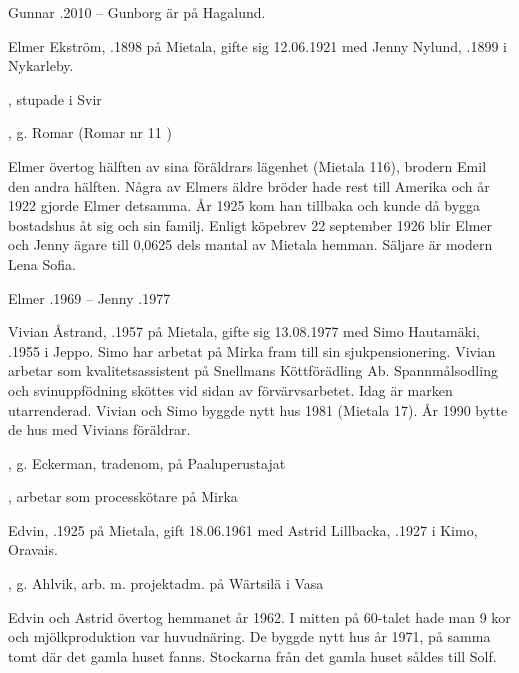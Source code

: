 Gunnar .2010  --  Gunborg är på Hagalund.


Elmer Ekström, .1898 på Mietala, gifte sig 12.06.1921 med Jenny Nylund, .1899 i Nykarleby.
\begin{jhchildren}
  \item {}, stupade i Svir
  \item {}
  \item {}, g. Romar (Romar nr 11 )
\end{jhchildren}
Elmer övertog hälften av sina föräldrars lägenhet (Mietala 116), brodern Emil den andra hälften. Några av Elmers äldre bröder hade rest till  Amerika och år 1922 gjorde Elmer detsamma. År 1925 kom han tillbaka och kunde då bygga bostadshus åt sig och sin familj. Enligt köpebrev 22 september 1926 blir Elmer och Jenny ägare till 0,0625 dels mantal av Mietala hemman. Säljare är modern Lena Sofia.

Elmer .1969  --  Jenny .1977





Vivian Åstrand, .1957 på Mietala, gifte sig 13.08.1977 med Simo Hautamäki, .1955 i Jeppo. Simo har arbetat på Mirka fram till sin sjukpensionering. Vivian arbetar som kvalitetsassistent på Snellmans Köttförädling Ab. Spannmålsodling och  svinuppfödning sköttes vid sidan av förvärvsarbetet. Idag är marken utarrenderad.
Vivian och Simo byggde nytt hus 1981 (Mietala 17). År 1990 bytte de hus med Vivians föräldrar.

\begin{jhchildren}
  \item {}, g. Eckerman, tradenom, på Paaluperustajat
  \item {}, arbetar som processkötare på Mirka
\end{jhchildren}



Edvin, .1925 på Mietala, gift  18.06.1961 med Astrid Lillbacka, .1927 i Kimo, Oravais.
\begin{jhchildren}
  \item {}
  \item {}, g. Ahlvik, arb. m. projektadm. på Wärtsilä i Vasa
\end{jhchildren}
Edvin och Astrid övertog hemmanet år 1962. I mitten på 60-talet hade man 9 kor och mjölkproduktion var huvudnäring. De  byggde nytt hus år 1971, på samma tomt där det gamla huset fanns. Stockarna från det gamla huset såldes till Solf.

